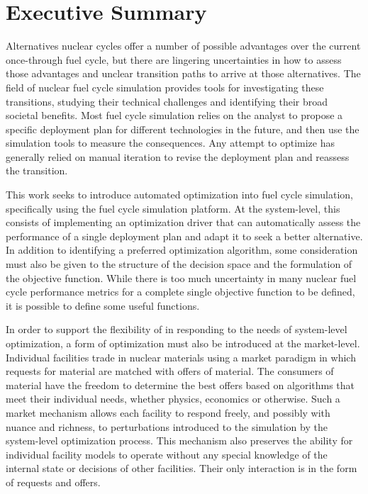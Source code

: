 \section*{Executive Summary}

Alternatives nuclear cycles offer a number of possible advantages over the
current once-through fuel cycle, but there are lingering uncertainties in how
to assess those advantages and unclear transition paths to arrive at those
alternatives.  The field of nuclear fuel cycle simulation provides tools for
investigating these transitions, studying their technical challenges and
identifying their broad societal benefits.  Most fuel cycle simulation relies
on the analyst to propose a specific deployment plan for different
technologies in the future, and then use the simulation tools to measure the
consequences.  Any attempt to optimize has generally relied on manual
iteration to revise the deployment plan and reassess the transition.

This work seeks to introduce automated optimization into fuel cycle
simulation, specifically using the \Cyclus{} fuel cycle simulation platform.
At the system-level, this consists of implementing an optimization driver that
can automatically assess the performance of a single deployment plan and adapt
it to seek a better alternative.  In addition to identifying a preferred
optimization algorithm, some consideration must also be given to the structure
of the decision space and the formulation of the objective function.  While
there is too much uncertainty in many nuclear fuel cycle performance metrics
for a complete single objective function to be defined, it is possible to
define some useful functions.

In order to support the flexibility of \Cyclus{} in responding to the needs of
system-level optimization, a form of optimization must also be introduced at
the market-level.  Individual facilities trade in nuclear materials using a
market paradigm in which requests for material are matched with offers of
material.  The consumers of material have the freedom to determine the best
offers based on algorithms that meet their individual needs, whether physics,
economics or otherwise.  Such a market mechanism allows each facility to
respond freely, and possibly with nuance and richness, to perturbations
introduced to the simulation by the system-level optimization process.  This
mechanism also preserves the ability for individual facility models to operate
without any special knowledge of the internal state or decisions of other
facilities.  Their only interaction is in the form of requests and offers.

